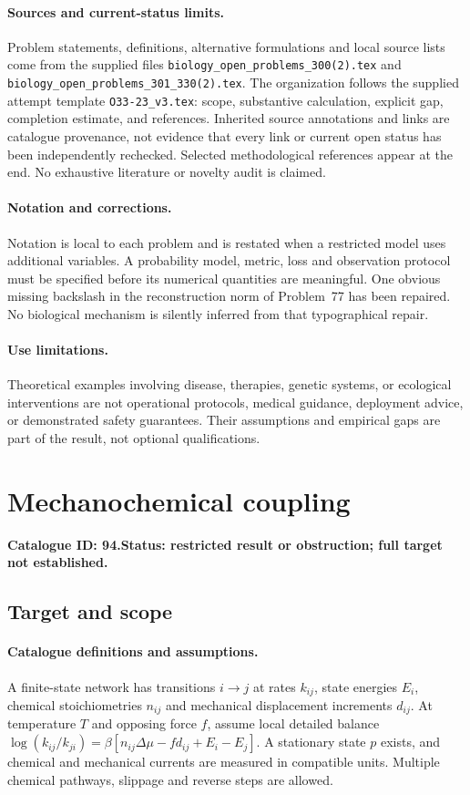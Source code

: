 \documentclass[11pt]{article}
\begin{document}
\paragraph{Sources and current-status limits.}
Problem statements, definitions, alternative formulations and local source lists
come from the supplied files
\texttt{biology\_open\_problems\_300(2).tex} and
\texttt{biology\_open\_problems\_301\_330(2).tex}.
The organization follows the supplied attempt template
\texttt{O33-23\_v3.tex}: scope, substantive calculation, explicit gap,
completion estimate, and references. Inherited source annotations and links are
catalogue provenance, not evidence that every link or current open status has
been independently rechecked. Selected methodological references appear at the
end. No exhaustive literature or novelty audit is claimed.

\paragraph{Notation and corrections.}
Notation is local to each problem and is restated when a restricted model uses
additional variables. A probability model, metric, loss and observation protocol
must be specified before its numerical quantities are meaningful. One obvious
missing backslash in the reconstruction norm of Problem~77 has been repaired.
No biological mechanism is silently inferred from that typographical repair.

\paragraph{Use limitations.}
Theoretical examples involving disease, therapies, genetic systems, or ecological
interventions are not operational protocols, medical guidance, deployment advice,
or demonstrated safety guarantees. Their assumptions and empirical gaps are part
of the result, not optional qualifications.

\setcounter{section}{93}
\section{Mechanochemical coupling}
\label{prob:094}
\noindent\textbf{Catalogue ID: 94.}\quad \textbf{Status: restricted result or obstruction; full target not established.}
\subsection{Target and scope}
\paragraph{Catalogue definitions and assumptions.}
A finite-state network has transitions $i\to j$ at rates $k_{ij}$, state energies $E_i$, chemical stoichiometries $n_{ij}$ and mechanical displacement increments $d_{ij}$. At temperature $T$ and opposing force $f$, assume local detailed balance
$\log(k_{ij}/k_{ji})=\beta[n_{ij}\Delta\mu-fd_{ij}+E_i-E_j]$.
A stationary state $p$ exists, and chemical and mechanical currents are measured in compatible units. Multiple chemical pathways, slippage and reverse steps are allowed.
\end{document}
